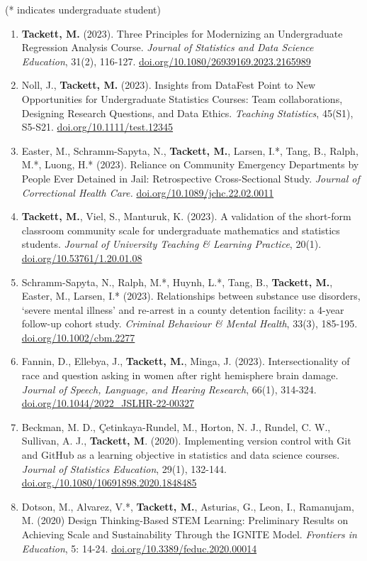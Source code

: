\documentclass[11pt,dvipsnames]{article}
\begin{document}
(* indicates undergraduate student)

\begin{enumerate}
\def\labelenumi{\arabic{enumi}.}
\item
  \textbf{Tackett, M.} (2023). Three Principles for Modernizing an
  Undergraduate Regression Analysis Course. \emph{Journal of Statistics
  and Data Science Education}, 31(2), 116-127.
  \href{https://doi.org/10.1080/26939169.2023.2165989}{doi.org/10.1080/26939169.2023.2165989}
\item
  Noll, J., \textbf{Tackett, M.} (2023). Insights from DataFest Point to
  New Opportunities for Undergraduate Statistics Courses: Team
  collaborations, Designing Research Questions, and Data Ethics.
  \emph{Teaching Statistics}, 45(S1), S5-S21.
  \href{https://doi.org/10.1111/test.12345}{doi.org/10.1111/test.12345}
\item
  Easter, M., Schramm-Sapyta, N., \textbf{Tackett, M.}, Larsen, I.*,
  Tang, B., Ralph, M.*, Luong, H.* (2023). Reliance on Community
  Emergency Departments by People Ever Detained in Jail: Retrospective
  Cross-Sectional Study. \emph{Journal of Correctional Health Care.}
  \href{https://doi.org/10.1089/jchc.22.02.0011}{doi.org/10.1089/jchc.22.02.0011}
\item
  \textbf{Tackett, M.}, Viel, S., Manturuk, K. (2023). A validation of
  the short-form classroom community scale for undergraduate mathematics
  and statistics students. \emph{Journal of University Teaching \&
  Learning Practice}, 20(1).
  \href{https://doi.org/10.53761/1.20.01.08}{doi.org/10.53761/1.20.01.08}
\item
  Schramm-Sapyta, N., Ralph, M.*, Huynh, L.*, Tang, B., \textbf{Tackett,
  M.}, Easter, M., Larsen, I.* (2023). Relationships between substance
  use disorders, `severe mental illness' and re-arrest in a county
  detention facility: a 4-year follow-up cohort study. \emph{Criminal
  Behaviour \& Mental Health}, 33(3), 185-195.
  \href{https://doi.org/10.1002/cbm.2277}{doi.org/10.1002/cbm.2277}
\item
  Fannin, D., Ellebya, J., \textbf{Tackett, M.}, Minga, J. (2023).
  Intersectionality of race and question asking in women after right
  hemisphere brain damage. \emph{Journal of Speech, Language, and
  Hearing Research}, 66(1), 314-324.
  \href{https://doi.org/10.1044/2022_JSLHR-22-00327}{doi.org/10.1044/2022\_JSLHR-22-00327}
\item
  Beckman, M. D., Çetinkaya-Rundel, M., Horton, N. J., Rundel, C. W.,
  Sullivan, A. J., \textbf{Tackett, M}. (2020). Implementing version
  control with Git and GitHub as a learning objective in statistics and
  data science courses. \emph{Journal of Statistics Education}, 29(1),
  132-144.
  \href{https://doi.org./10.1080/10691898.2020.1848485}{doi.org./10.1080/10691898.2020.1848485}
\item
  Dotson, M., Alvarez, V.*, \textbf{Tackett, M.}, Asturias, G., Leon,
  I., Ramanujam, M. (2020) Design Thinking-Based STEM Learning:
  Preliminary Results on Achieving Scale and Sustainability Through the
  IGNITE Model. \emph{Frontiers in Education}, 5: 14-24.
  \href{https://doi.org/10.3389/feduc.2020.00014}{doi.org/10.3389/feduc.2020.00014}
\end{enumerate}
\end{document}
